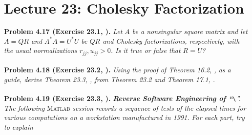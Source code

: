\documentclass[a4paper,oneside]{book}
\numberwithin{equation}{chapter}
\begin{document}
\section{Lecture 23: Cholesky Factorization}
\textbf{Problem 4.17 (Exercise 23.1, \cite{1}).} \textit{Let $A$ be a nonsingular square matrix and let $A=QR$ and $A^* A =U^* U$ be $QR$ and Cholesky factorizations, respectively, with the usual normalizations $r_{jj},u_{jj}>0$. Is it true or false that $R=U$?}\\
\\
\textbf{Problem 4.18 (Exercise 23.2, \cite{1}).} \textit{Using the proof of Theorem 16.2, \cite{1}, as a guide, derive Theorem 23.3, \cite{1}, from Theorem 23.2 and Theorem 17.1, \cite{1}.}\\
\\
\textbf{Problem 4.19 (Exercise 23.3, \cite{1}).} \textit{\textbf{Reverse Software Engineering of ``}}\verb|\|\textit{''. The following}\textsc{ Matlab}\textit{ session records a sequence of tests of the elapsed times for various computations on a workstation manufactured in 1991. For each part, try to explain}
\end{document}

